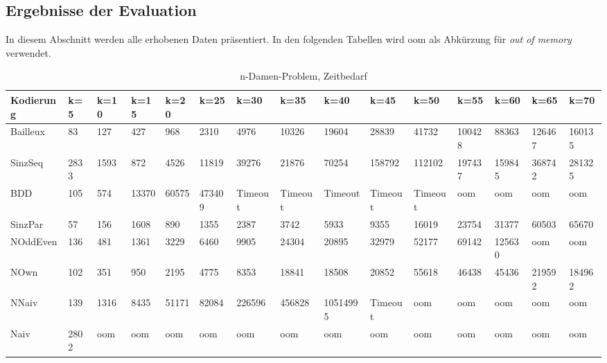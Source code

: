 \documentclass[a4,abstract=on]{scrartcl}
\newcommand*\stdsection{}
\let\stdsection\section
\renewcommand*\section{%
    \clearpage\ifodd\value{page}\else\mbox{}\clearpage\fi
    \stdsection}
\begin{document}
\begin{landscape}
	\section{Ergebnisse der Evaluation}\label{anhang}
 In diesem Abschnitt werden alle erhobenen Daten präsentiert. In den folgenden Tabellen wird oom als Abkürzung für \textit{out of memory} verwendet.


	 \begin{table}[h!]
    \small
    \setlength{\tabcolsep}{0.11cm}
     \centering
     \begin{tabular}[width=\textwidth]{|l|l|l|l|l|l|l|l|l|l|l|l|l|l|l|}
	\hline
       \textbf{Kodierung}  & \textbf{k=5} & \textbf{k=10} & \textbf{k=15} &\textbf{k=20} &\textbf{k=25} &\textbf{k=30} &\textbf{k=35} &\textbf{k=40} &\textbf{k=45} &\textbf{k=50} &\textbf{k=55} &\textbf{k=60} &\textbf{k=65} &\textbf{k=70}\\
	\hline
	Bailleux & 83 & 127 & 427 & 968 & 2310 & 4976 & 10326 & 19604 & 28839 & 41732 & 100428 & 88363 & 126467 & 160135\\
\hline
	SinzSeq & 2833 & 1593 & 872 & 4526 & 11819 & 39276 & 21876 & 70254 & 158792 & 112102 & 197437 & 159845 & 368742 & 281325 \\
\hline
	BDD & 105 & 574 & 13370 & 60575 & 473409 & Timeout & Timeout &Timeout &Timeout &Timeout & oom & oom & oom & oom\\
\hline
	SinzPar & 57 & 156 & 1608 & 890 & 1355 & 2387 & 3742 & 5933 & 9355 & 16019 & 23754 & 31377 & 60503 & 65670 \\
\hline
	NOddEven & 136 & 481 & 1361 & 3229 & 6460 & 9905 & 24304 & 20895 & 32979 & 52177& 69142 & 125630 & oom & oom\\
\hline
	NOwn & 102 & 351 & 950 & 2195 & 4775 & 8353& 18841 & 18508 & 20852 & 55618 & 46438 & 45436 & 219592 & 184962\\
 \hline
	NNaiv & 139 & 1316 & 8435 & 51171 & 82084 & 226596 & 456828 & 10514995 & Timeout & oom & oom & oom & oom & oom\\
\hline
	Naiv & 2802 & oom &  oom &  oom &  oom &  oom &  oom &  oom &  oom &  oom &  oom &  oom &  oom &  oom\\
\hline
       
     \end{tabular}

     \caption{n-Damen-Problem, Zeitbedarf}
     \label{tbl:beispieltabelle}


\end{table}
\end{landscape}
\end{document}
